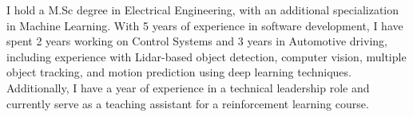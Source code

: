 I hold a M.Sc degree in Electrical Engineering, with an additional specialization in Machine Learning. With 5 years of experience in software development, I have spent 2 years working on Control Systems and 3 years in Automotive driving, including experience with Lidar-based object detection, computer vision, multiple object tracking, and motion prediction using deep learning techniques. Additionally, I have a year of experience in a technical leadership role and currently serve as a teaching assistant for a reinforcement learning course.